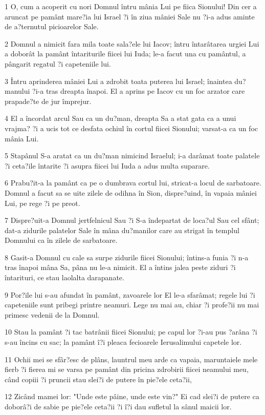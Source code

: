 \par 1 O, cum a acoperit cu nori Domnul întru mânia Lui pe fiica Sionului! Din cer a aruncat pe pamânt mare?ia lui Israel ?i în ziua mâniei Sale nu ?i-a adus aminte de a?ternutul picioarelor Sale.
\par 2 Domnul a nimicit fara mila toate sala?ele lui Iacov; întru întarâtarea urgiei Lui a doborât la pamânt întariturile fiicei lui Iuda; le-a facut una cu pamântul, a pângarit regatul ?i capeteniile lui.
\par 3 Întru aprinderea mâniei Lui a zdrobit toata puterea lui Israel; înaintea du?manului ?i-a tras dreapta înapoi. El a aprins pe Iacov cu un foc arzator care prapade?te de jur împrejur.
\par 4 El a încordat arcul Sau ca un du?man, dreapta Sa a stat gata ca a unui vrajma? ?i a ucis tot ce desfata ochiul în cortul fiicei Sionului; varsat-a ca un foc mânia Lui.
\par 5 Stapânul S-a aratat ca un du?man nimicind Israelul; i-a darâmat toate palatele ?i ceta?ile întarite ?i asupra fiicei lui Iuda a adus multa suparare.
\par 6 Prabu?it-a la pamânt ca pe o dumbrava cortul lui, stricat-a locul de sarbatoare. Domnul a facut sa se uite zilele de odihna în Sion, dispre?uind, în vapaia mâniei Lui, pe rege ?i pe preot.
\par 7 Dispre?uit-a Domnul jertfelnicul Sau ?i S-a îndepartat de loca?ul Sau cel sfânt; dat-a zidurile palatelor Sale în mâna du?manilor care au strigat în templul Domnului ca în zilele de sarbatoare.
\par 8 Gasit-a Domnul cu cale sa surpe zidurile fiicei Sionului; întins-a funia ?i n-a tras înapoi mâna Sa, pâna nu le-a nimicit. El a întins jalea peste ziduri ?i întarituri, ce stau laolalta darapanate.
\par 9 Por?ile lui s-au afundat în pamânt, zavoarele lor El le-a sfarâmat; regele lui ?i capeteniile sunt pribegi printre neamuri. Lege nu mai au, chiar ?i profe?ii nu mai primesc vedenii de la Domnul.
\par 10 Stau la pamânt ?i tac batrânii fiicei Sionului; pe capul lor ?i-au pus ?arâna ?i s-au încins cu sac; la pamânt î?i pleaca fecioarele Ierusalimului capetele lor.
\par 11 Ochii mei se sfâr?esc de plâns, launtrul meu arde ca vapaia, maruntaiele mele fierb ?i fierea mi se varsa pe pamânt din pricina zdrobirii fiicei neamului meu, când copiii ?i pruncii stau slei?i de putere în pie?ele ceta?ii,
\par 12 Zicând mamei lor: "Unde este pâine, unde este vin?" Ei cad slei?i de putere ca doborâ?i de sabie pe pie?ele ceta?ii ?i î?i dau sufletul la sânul maicii lor.
